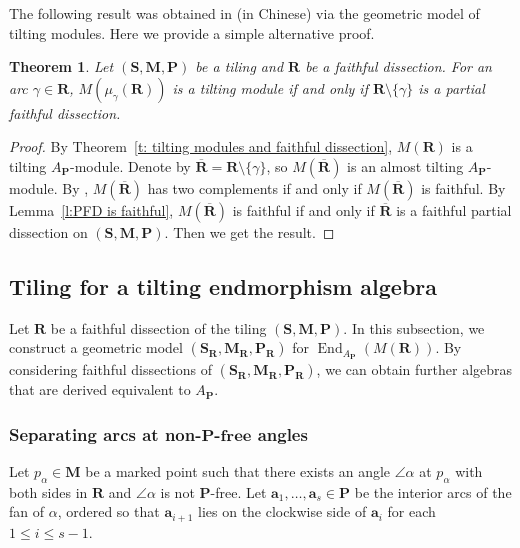 \documentclass[a4paper,10pt]{amsart}
\theoremstyle{plain}          %
\newtheorem{theorem}{Theorem}[section]
\theoremstyle{definition}
\def\SS{\mathbf{S}}
\def\RR{\mathbf{R}}
\def\af{\mathbf{a}}
\def\MM{\mathbf{M}}
\def\PP{\mathbf{P}}
\def\MM{\mathbf{M}}
\newcommand{\FPD}{\mathbf{FPD}}
\newcommand{\End}{\operatorname{End}\nolimits}
\newcommand{\ie}{{\em i.e.}\ }
\begin{document}
The following result was obtained in \cite{Nie} (in Chinese) via the geometric model of tilting modules. Here we provide a simple alternative proof.
 \begin{theorem}\label{t:tilting flip}
     Let $(\SS, \MM, \PP)$ be a tiling and $\mathbf{R}$ be a faithful dissection. For an arc $\gamma \in\mathbf{R}$,  $M(\mu_\gamma(\RR))$ is a tilting module if and only if $\mathbf{R} \setminus \{\gamma\}$  is a partial faithful dissection.
 \end{theorem}
 \begin{proof}
 By Theorem~\ref{t: tilting modules and faithful dissection},  $M(\RR)$ is a tilting $A_\PP$-module. Denote by $\overline{\RR}=\RR\setminus\{\gamma\}$, so $M(\overline{\RR})$ is an almost tilting $A_{\PP}$-module. By \cite[Proposition 1.2 ]{HU05}, $M(\overline{\RR})$ has two complements if and only if $M(\overline{\RR})$ is faithful. By Lemma~\ref{l:PFD is faithful}, $M(\overline{\RR})$ is faithful if and only if $\overline{\RR}$ is a faithful partial dissection on $(\SS, \MM, \PP)$. Then we get the result.
 \end{proof}

\subsection{Tiling for a tilting endmorphism algebra}\label{s:geo model of endo algebra}

Let $\mathbf{R}$ be a faithful dissection of the tiling $(\SS,\MM,\PP)$. In this subsection, we construct a geometric model $(\SS_{\mathbf{R}}, \MM_{\mathbf{R}}, \PP_{\mathbf{R}})$ for $\End_{A_\PP}(M(\mathbf{R}))$. By considering faithful dissections of $(\SS_{\mathbf{R}}, \MM_{\mathbf{R}}, \PP_{\mathbf{R}})$, we can obtain further algebras that are derived equivalent to $A_\PP$.

\subsubsection{Separating arcs at non-$\PP$-$\mathbf{free}$ angles} 
Let $p_\alpha \in \MM$ be a marked point such that there exists an angle $\angle\alpha$ at $p_\alpha$ with both sides in $\mathbf{R}$ and $\angle\alpha$ is not $\PP$-free. Let $\af_1, \dots, \af_s \in \PP$ be the interior arcs of the fan of $\alpha$, ordered so that $\af_{i+1}$ lies on the clockwise side of $\af_i$ for each $1 \leq i \leq s-1$.
\end{document}
